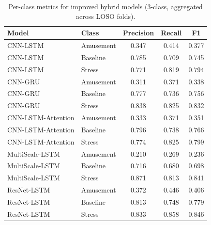 \documentclass[11pt]{article}
\begin{document}
\begin{table}[H]
\centering
\caption{Per-class metrics for improved hybrid models (3-class, aggregated across LOSO folds).}
\label{tab:hybrid-3class-perclass}
\begin{tabular}{llccc}
\toprule
\textbf{Model} & \textbf{Class} & \textbf{Precision} & \textbf{Recall} & \textbf{F1} \\
\midrule
CNN-LSTM           & Amusement & 0.347 & 0.414 & 0.377 \\
CNN-LSTM           & Baseline  & 0.785 & 0.709 & 0.745 \\
CNN-LSTM           & Stress    & 0.771 & 0.819 & 0.794 \\
\midrule
CNN-GRU            & Amusement & 0.311 & 0.371 & 0.338 \\
CNN-GRU            & Baseline  & 0.777 & 0.736 & 0.756 \\
CNN-GRU            & Stress    & 0.838 & 0.825 & 0.832 \\
\midrule
CNN-LSTM-Attention & Amusement & 0.333 & 0.371 & 0.351 \\
CNN-LSTM-Attention & Baseline  & 0.796 & 0.738 & 0.766 \\
CNN-LSTM-Attention & Stress    & 0.774 & 0.825 & 0.799 \\
\midrule
MultiScale-LSTM    & Amusement & 0.210 & 0.269 & 0.236 \\
MultiScale-LSTM    & Baseline  & 0.716 & 0.680 & 0.698 \\
MultiScale-LSTM    & Stress    & 0.871 & 0.813 & 0.841 \\
\midrule
ResNet-LSTM        & Amusement & 0.372 & 0.446 & 0.406 \\
ResNet-LSTM        & Baseline  & 0.813 & 0.748 & 0.779 \\
ResNet-LSTM        & Stress    & 0.833 & 0.858 & 0.846 \\
\bottomrule
\end{tabular}
\end{table}
\end{document}
